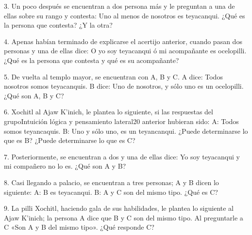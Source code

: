 3. Un poco después se encuentran a dos persona más y le preguntan a una de ellas sobre su rango y contesta: Uno al menos de nosotros es teyacanqui. ¿Qué es la persona que contesta? ¿Y la otra?

4. Apenas habían terminado de explicarse el acertijo anterior, cuando pasan dos personas y una de ellas dice: O yo soy teyacanqui ó mi acompañante es ocelopilli. ¿Qué es la persona que contesta y qué es su acompañante?

5. De vuelta al templo mayor, se encuentran con A, B y C. A dice: Todos nosotros somos teyacanquis. B dice: Uno de nosotros, y sólo uno es un ocelopilli. ¿Qué son A, B y C?

6. Xochitl al Ajaw K’inich, le plantea lo siguiente, si las respuestas del grupoIntuición lógica y pensamiento lateral20 anterior hubieran sido: A: Todos somos teyancaquis. B: Uno y sólo uno, es un teyancanqui. ¿Puede determinarse lo que es B? ¿Puede determinarse lo que es C?

7. Posteriormente, se encuentran a dos y una de ellas dice: Yo soy teyacanqui y mi compañero no lo es. ¿Qué son A y B?

8. Casi llegando a palacio, se encuentran a tres personas; A y B dicen lo siguiente: A: B es teyacanqui. B: A y C son del mismo tipo. ¿Qué es C?

9. La pilli Xochitl, haciendo gala de sus habilidades, le plantea lo siguiente al Ajaw K’inich; la persona A dice que B y C son del mismo tipo. Al preguntarle a C «Son A y B del mismo tipo». ¿Qué responde C?